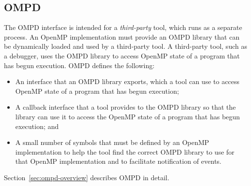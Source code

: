 \subsection{OMPD}

The OMPD interface is intended for a \emph{third-party} tool, which runs as a 
separate process. An OpenMP implementation must provide an OMPD
library that can be dynamically loaded and used by a third-party tool.
A third-party tool, such as a debugger, uses the OMPD library to access
OpenMP state of a program that has begun execution. OMPD defines the following:

\begin{itemize}
\item An interface that an OMPD library exports, which a tool can use 
      to access OpenMP state of a program that has begun execution;
\item A callback interface that a tool provides to the OMPD library so 
      that the library can use it to access the OpenMP state of a program 
      that has begun execution; and
\item A small number of symbols that must be defined by an OpenMP 
      implementation to help the tool find the correct OMPD library to use 
      for that OpenMP implementation and to facilitate notification of events.
\end{itemize}
Section~\ref{sec:ompd-overview} describes OMPD in detail.

